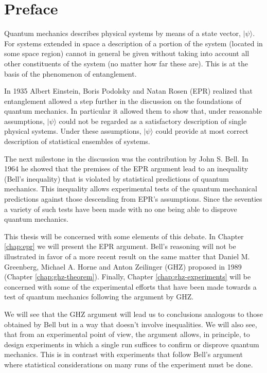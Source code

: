 \chapter*{Preface}
Quantum mechanics describes physical systems by means of a state vector, $| \psi \rangle$. For systems extended in space a description of a portion of the system (located in some space region) cannot in general be given without taking into account all other constituents of the system (no matter how far these are). This is at the basis of the phenomenon of entanglement.

In 1935 Albert Einstein, Boris Podolsky and Natan Rosen (EPR) realized that entanglement allowed a step further in the discussion on the foundations of quantum mechanics. In particular it allowed them to show that, under reasonable assumptions, $| \psi \rangle$ could not be regarded as a satisfactory description of single physical systems. Under these assumptions, $| \psi \rangle$ could provide at most correct description of statistical ensembles of systems.

The next milestone in the discussion was the contribution by John S. Bell. In 1964 he showed that the premises of the EPR argument lead to an inequality (Bell's inequality) that is violated by statistical predictions of quantum mechanics. This inequality allows experimental tests of the quantum mechanical predictions against those descending from EPR's assumptions. Since the seventies a variety of such tests have been made with no one being able to disprove quantum mechanics.

This thesis will be concerned with some elements of this debate. In Chapter \ref{chap:epr} we will present the EPR argument. Bell's reasoning will not be illustrated in favor of a more recent result on the same matter that Daniel M. Greenberg, Michael A. Horne and Anton Zeilinger (GHZ) proposed in 1989 (Chapter \ref{chap:ghz-theorem}). Finally, Chapter \ref{chap:ghz-experiments} will be concerned with some of the experimental efforts that have been made towards a test of quantum mechanics following the argument by GHZ.

We will see that the GHZ argument will lead us to conclusions analogous to those obtained by Bell but in a way that doesn't involve inequalities. We will also see, that from an experimental point of view, the argument allows, in principle, to design experiments in which a single run suffices to confirm or disprove quantum mechanics. This is in contrast with experiments that follow Bell's argument where statistical considerations on many runs of the experiment must be done.
